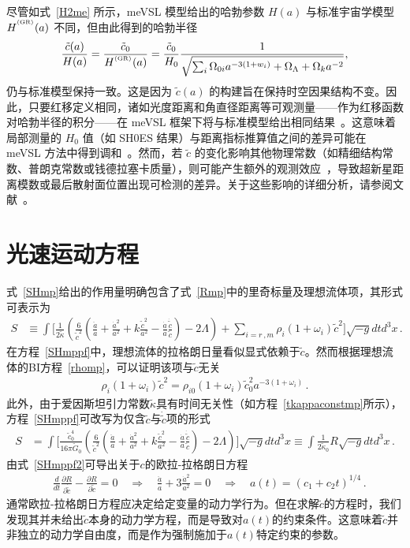 \documentclass[jkps,preprint,fleqn]{revtex4}
\newcommand{\tc}{\tilde{c}}
\newcommand{\tG}{\tilde{G}}
\newcommand{\GR}{\text{GR}}
\newcommand{\tkapp}{\tilde{\kappa}}
\begin{document}
尽管如式~\eqref{H2me} 所示，meVSL 模型给出的哈勃参数 $H(a)$ 与标准宇宙学模型 $H^{\textsuperscript{\tiny (\GR)}}(a)$ 不同，但由此得到的哈勃半径
\begin{equation}
    \frac{\tilde{c}(a)}{H(a)}  = \frac{\tc_0}{H^{\textsuperscript{\tiny (\GR)}}(a)} = \frac{\tilde{c}_0}{H_0} \frac{1}{\sqrt{\sum_i \Omega_{0i} a^{-3(1+w_i)} + \Omega_\Lambda + \Omega_k a^{-2}}},
\end{equation}
仍与标准模型保持一致。这是因为 $\tilde{c}(a)$ 的构建旨在保持时空因果结构不变。因此，只要红移定义相同，诸如光度距离和角直径距离等可观测量——作为红移函数对哈勃半径的积分——在 meVSL 框架下将与标准模型给出相同结果~\cite{Lee:2020zts}。这意味着局部测量的 $H_0$ 值（如 SH0ES 结果）与距离指标推算值之间的差异可能在 meVSL 方法中得到调和~\cite{Lee:2024nya}。然而，若 $\tilde{c}$ 的变化影响其他物理常数（如精细结构常数、普朗克常数或钱德拉塞卡质量），则可能产生额外的观测效应~\cite{Lee:2020zts,Lee:2021xwh}，导致超新星距离模数或最后散射面位置出现可检测的差异。关于这些影响的详细分析，请参阅文献~\cite{Lee:2020zts}。
\section{光速运动方程}
\label{sec:sol}

式~\eqref{SHmp}给出的作用量明确包含了式~\eqref{Rmp}中的里奇标量及理想流体项，其形式可表示为
\begin{align}
S &\equiv \int \Biggl[ \frac{1}{2 \tkapp} \left( \frac{6}{\tc^2} \left( \frac{\ddot{a}}{a} + \frac{\dot{a}^2}{a^2} + k \frac{\tc^2}{a^2} - \frac{\dot{a}}{a} \frac{\dot{\tc}}{ \tc} \right)  - 2 \Lambda \right) + \sum_{i=r\,,m} \rho_i (1 + \omega_i ) \tc^2 \Biggr] \sqrt{-g} dt d^3x \label{SHmppf} \,.
\end{align}
在方程~\eqref{SHmppf}中，理想流体的拉格朗日量看似显式依赖于$\tc$。然而根据理想流体的BI方程~\eqref{rhomp}，可以证明该项与$\tc$无关
\begin{align}
 \rho_i (1 + \omega_i ) \tc^2 =  \rho_{i0} (1 + \omega_i ) \tc_{0}^2 a^{-3(1 + \omega_i )}  \label{rhoi} \,.
\end{align}
此外，由于爱因斯坦引力常数$\tkapp$具有时间无关性（如方程~\eqref{tkappaconstmp}所示），方程~\eqref{SHmppf}可改写为仅含$\tc$与$\dot{\tc}$项的形式
\begin{align}
S &= \int \Biggl[ \frac{\tc_0^4}{16 \pi \tG_0} \left( \frac{6}{\tc^2} \left( \frac{\ddot{a}}{a} + \frac{\dot{a}^2}{a^2} + k \frac{\tc^2}{a^2} - \frac{\dot{a}}{a} \frac{\dot{\tc}}{ \tc} \right)  - 2 \Lambda \right)  \Biggr] \sqrt{-g} dt d^3x \equiv \int \frac{1}{2 \tkapp_0} R \sqrt{-g} dt d^3x \label{SHmppf2} \,.
\end{align}
由式~\eqref{SHmppf2}可导出关于$c$的欧拉-拉格朗日方程
\begin{align}
& \frac{d}{dt} \frac{\partial R}{\partial \dot{\tc}} - \frac{\partial R}{\partial \tc} = 0 \quad \Rightarrow \quad \frac{\ddot{a}}{a} + 3 \frac{\dot{a}^2}{a^2} = 0 \quad \Rightarrow \quad a(t) = (c_1 + c_2 t)^{1/4} \label{eomtc} \,.
\end{align}
通常欧拉-拉格朗日方程应决定给定变量的动力学行为。但在求解$\tc$的方程时，我们发现其并未给出$\tc$本身的动力学方程，而是导致对$a(t)$的约束条件。这意味着$\tc$并非独立的动力学自由度，而是作为强制施加于$a(t)$特定约束的参数。
\end{document}
